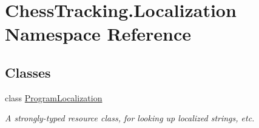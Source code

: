 \hypertarget{namespace_chess_tracking_1_1_localization}{}\section{Chess\+Tracking.\+Localization Namespace Reference}
\label{namespace_chess_tracking_1_1_localization}
\subsection*{Classes}
\begin{DoxyCompactItemize}
\item 
class \mbox{\hyperlink{class_chess_tracking_1_1_localization_1_1_program_localization}{Program\+Localization}}
\begin{DoxyCompactList}\small\item\em A strongly-\/typed resource class, for looking up localized strings, etc. \end{DoxyCompactList}\end{DoxyCompactItemize}
